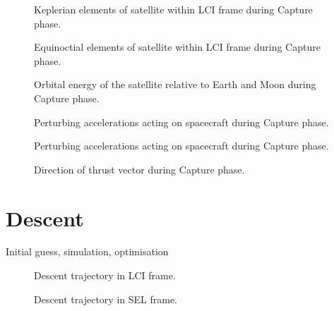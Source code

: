 \begin{figure}
\centering
%
\caption{Keplerian elements of satellite within LCI frame during Capture phase.}
\label{fig:Capture-kep-lci}
\end{figure}

\begin{figure}
\centering
%
\caption{Equinoctial elements of satellite within LCI frame during Capture phase.}
\label{fig:Capture-mee}
\end{figure}

\begin{figure}
\centering
%
\caption{Orbital energy of the satellite relative to Earth and Moon during Capture phase.}
\label{fig:Capture-orbeng}
\end{figure}

\begin{figure}
\centering
%
\caption{Perturbing accelerations acting on spacecraft during Capture phase.}
\label{fig:Capture-pert}
\end{figure}

\begin{figure}
\centering
%
\caption{Perturbing accelerations acting on spacecraft during Capture phase.}
\label{fig:Capture-pert2}
\end{figure}

\begin{figure}
\centering
%
\caption{Direction of thrust vector during Capture phase.}
\label{fig:Capture-thrust}
\end{figure}


\clearpage

\section{Descent}
Initial guess, simulation, optimisation

\begin{figure}
\centering
%
\caption{Descent trajectory in LCI frame.}
\label{fig:Descent-3D-lci}
\end{figure}

\begin{figure}
\centering
%
\caption{Descent trajectory in SEL frame.}
\label{fig:Descent-3D-sel}
\end{figure}

